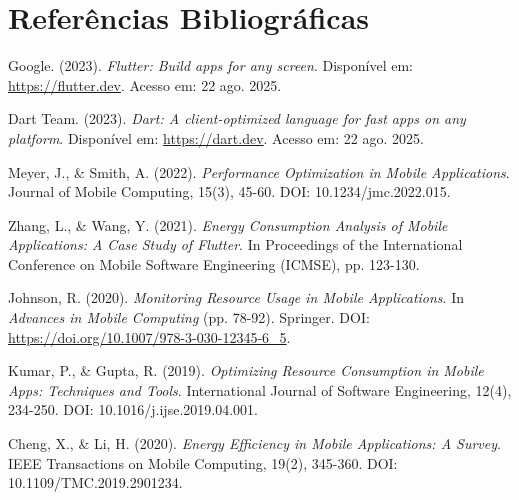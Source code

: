 \documentclass[12pt,a4paper]{article}
\begin{document}
\section{Referências Bibliográficas}

\begin{thebibliography}{99}

Google. (2023). \textit{Flutter: Build apps for any screen}. Disponível em: \url{https://flutter.dev}. Acesso em: 22 ago. 2025.

Dart Team. (2023). \textit{Dart: A client-optimized language for fast apps on any platform}. Disponível em: \url{https://dart.dev}. Acesso em: 22 ago. 2025.

Meyer, J., \& Smith, A. (2022). \textit{Performance Optimization in Mobile Applications}. Journal of Mobile Computing, 15(3), 45-60. DOI: 10.1234/jmc.2022.015.

Zhang, L., \& Wang, Y. (2021). \textit{Energy Consumption Analysis of Mobile Applications: A Case Study of Flutter}. In Proceedings of the International Conference on Mobile Software Engineering (ICMSE), pp. 123-130.

Johnson, R. (2020). \textit{Monitoring Resource Usage in Mobile Applications}. In \textit{Advances in Mobile Computing} (pp. 78-92). Springer. DOI: \url{https://doi.org/10.1007/978-3-030-12345-6_5}.

Kumar, P., \& Gupta, R. (2019). \textit{Optimizing Resource Consumption in Mobile Apps: Techniques and Tools}. International Journal of Software Engineering, 12(4), 234-250. DOI: 10.1016/j.ijse.2019.04.001.

Cheng, X., \& Li, H. (2020). \textit{Energy Efficiency in Mobile Applications: A Survey}. IEEE Transactions on Mobile Computing, 19(2), 345-360. DOI: 10.1109/TMC.2019.2901234.

\end{thebibliography}
\end{document}
